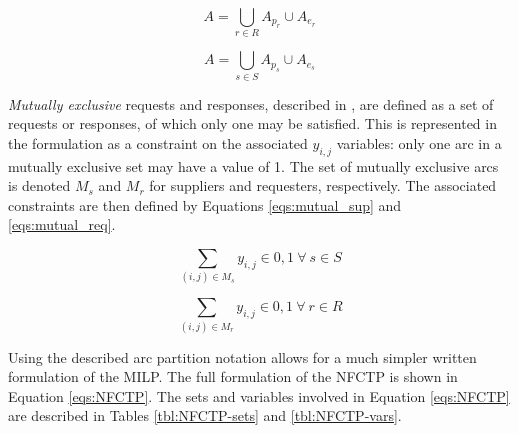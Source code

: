 \begin{equation}\label{eqs:arc-union}
  A = \bigcup_{r \in R} A_{p_r} \cup A_{e_r}
\end{equation}

\begin{equation}\label{eqs:arc-union}
  A = \bigcup_{s \in S} A_{p_s} \cup A_{e_s}
\end{equation}


\textit{Mutually exclusive} requests and responses, described in
, are defined as a set of requests or responses, of which
only one may be satisfied. This is represented in the formulation as a
constraint on the associated $y_{i,j}$ variables: only one arc in a mutually
exclusive set may have a value of 1. The set of mutually exclusive arcs is
denoted $M_s$ and $M_r$ for suppliers and requesters, respectively. The
associated constraints are then defined by Equations \ref{eqs:mutual_sup} and
\ref{eqs:mutual_req}.


\begin{equation}\label{eqs:mutual_sup}
  \sum_{(i, j) \in M_{s}} y_{i,j} \in {0,1} \: \forall \: s \in S 
\end{equation}


\begin{equation}\label{eqs:mutual_req}
  \sum_{(i, j) \in M_{r}} y_{i,j} \in {0,1} \: \forall \: r \in R 
\end{equation}


Using the described arc partition notation allows for a much simpler written
formulation of the MILP. The full formulation of the NFCTP is shown in Equation
\ref{eqs:NFCTP}.  The sets and variables involved in Equation \ref{eqs:NFCTP}
are described in Tables \ref{tbl:NFCTP-sets} and \ref{tbl:NFCTP-vars}.


